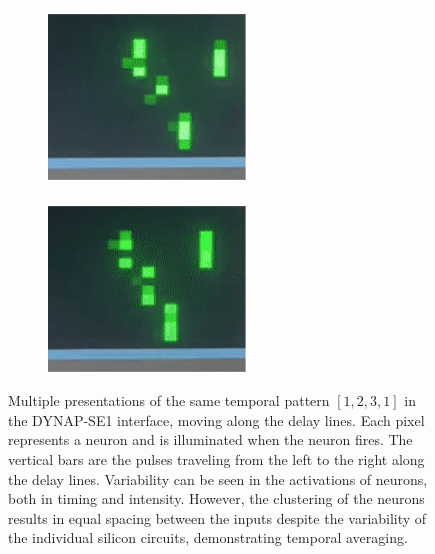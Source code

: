 \begin{figure}[h!]
\begin{subfigure}{0.22\textwidth}
    \caption{}
  \end{subfigure}
  \begin{subfigure}{0.22\textwidth}
    \includegraphics[width=\linewidth]{img/chapter5/pattern_3213_3.png}
    \caption{}
  \end{subfigure}
  \begin{subfigure}{0.22\textwidth}
    \includegraphics[width=\linewidth]{img/chapter5/pattern_3213_4.png}
    \caption{}
  \end{subfigure}
    \caption[Temporal pattern versions in the DYNAP-SE1 interface]{Multiple presentations of the same temporal pattern $[1,2,3,1]$ in the DYNAP-SE1 interface, moving along the delay lines. Each pixel represents a neuron and is illuminated when the neuron fires. The vertical bars are the pulses traveling from the left to the right along the delay lines. Variability can be seen in the activations of neurons, both in timing and intensity. However, the clustering of the neurons results in equal spacing between the inputs despite the variability of the individual silicon circuits, demonstrating temporal averaging.}
  \label{fig:temporal_patterns_on_dynapse}
\end{figure}


